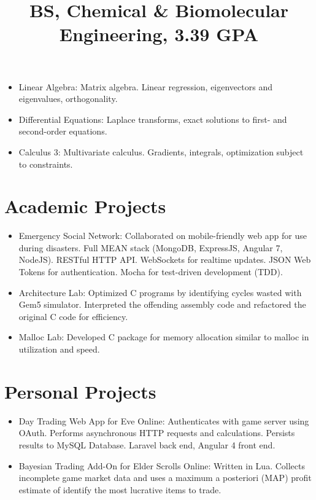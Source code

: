 \documentclass[12pt]{res} %
\begin{document}
\begin{resume}
          \title{\textbf{BS, Chemical \& Biomolecular Engineering, 3.39 GPA}}
          \begin{position}
            \vspace{-14pt}
            \begin{itemize}[leftmargin=-0.4cm]
            \itemsep0em
            \item Linear Algebra: Matrix algebra. Linear regression, eigenvectors and eigenvalues, orthogonality.
            \item Differential Equations: Laplace transforms, exact solutions to first- and second-order equations.
            \item Calculus 3: Multivariate calculus. Gradients, integrals, optimization subject to constraints.
            \end{itemize}
          \end{position}
          \vspace{-12pt}

        \section{Academic Projects}
          \begin{itemize}[leftmargin=-0.4cm]
          \itemsep0em
          \item Emergency Social Network: Collaborated on mobile-friendly web app for use during disasters. Full MEAN stack (MongoDB, ExpressJS, Angular 7, NodeJS). RESTful HTTP API. WebSockets for realtime updates. JSON Web Tokens for authentication. Mocha for test-driven development (TDD).
          \item Architecture Lab: Optimized C programs by identifying cycles wasted with Gem5 simulator. Interpreted the offending assembly code and refactored the original C code for efficiency.
          \item Malloc Lab: Developed C package for memory allocation similar to malloc in utilization and speed.
          \end{itemize}
          \vspace{-12pt}
          
        \section{Personal Projects}
        \begin{itemize}[leftmargin=-0.4cm]
        \itemsep0em
        \item Day Trading Web App for Eve Online: Authenticates with game server using OAuth. Performs asynchronous HTTP requests and calculations. Persists results to MySQL Database. Laravel back end, Angular 4 front end.
        \item Bayesian Trading Add-On for Elder Scrolls Online: Written in Lua. Collects incomplete game market data and uses a maximum a posteriori (MAP) profit estimate of identify the most lucrative items to trade.
        \end{itemize}
        \vspace{-12pt}


\end{resume}
\end{document}
